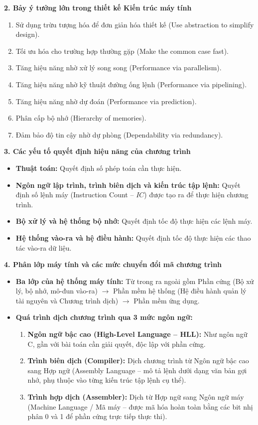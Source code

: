 \textbf{2. Bảy ý tưởng lớn trong thiết kế Kiến trúc máy tính}
\begin{enumerate}
    \item Sử dụng trừu tượng hóa để đơn giản hóa thiết kế (Use abstraction to simplify design).
    \item Tối ưu hóa cho trường hợp thường gặp (Make the common case fast).
    \item Tăng hiệu năng nhờ xử lý song song (Performance via parallelism).
    \item Tăng hiệu năng nhờ kỹ thuật đường ống lệnh (Performance via pipelining).
    \item Tăng hiệu năng nhờ dự đoán (Performance via prediction).
    \item Phân cấp bộ nhớ (Hierarchy of memories).
    \item Đảm bảo độ tin cậy nhờ dự phòng (Dependability via redundancy).
\end{enumerate}

\textbf{3. Các yếu tố quyết định hiệu năng của chương trình}
\begin{itemize}
    \item \textbf{Thuật toán:} Quyết định số phép toán cần thực hiện.
    \item \textbf{Ngôn ngữ lập trình, trình biên dịch và kiến trúc tập lệnh:} Quyết định số lệnh máy (Instruction Count -- $IC$) được tạo ra để thực hiện chương trình.
    \item \textbf{Bộ xử lý và hệ thống bộ nhớ:} Quyết định tốc độ thực hiện các lệnh máy.
    \item \textbf{Hệ thống vào-ra và hệ điều hành:} Quyết định tốc độ thực hiện các thao tác vào-ra dữ liệu.
\end{itemize}

\textbf{4. Phân lớp máy tính và các mức chuyển đổi mã chương trình}
\begin{itemize}
    \item \textbf{Ba lớp của hệ thống máy tính:} Từ trong ra ngoài gồm Phần cứng (Bộ xử lý, bộ nhớ, mô-đun vào-ra) $\rightarrow$ Phần mềm hệ thống (Hệ điều hành quản lý tài nguyên và Chương trình dịch) $\rightarrow$ Phần mềm ứng dụng.
    \item \textbf{Quá trình dịch chương trình qua 3 mức ngôn ngữ:}
    \begin{enumerate}
        \item \textbf{Ngôn ngữ bậc cao (High-Level Language -- HLL):} Như ngôn ngữ C, gần với bài toán cần giải quyết, độc lập với phần cứng.
        \item \textbf{Trình biên dịch (Compiler):} Dịch chương trình từ Ngôn ngữ bậc cao sang Hợp ngữ (Assembly Language -- mô tả lệnh dưới dạng văn bản gợi nhớ, phụ thuộc vào từng kiến trúc tập lệnh cụ thể).
        \item \textbf{Trình hợp dịch (Assembler):} Dịch từ Hợp ngữ sang Ngôn ngữ máy (Machine Language / Mã máy -- được mã hóa hoàn toàn bằng các bit nhị phân 0 và 1 để phần cứng trực tiếp thực thi).
    \end{enumerate}
\end{itemize}

